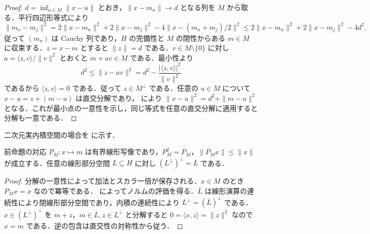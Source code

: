 \begin{proof}
$d=\inf_{u\in M}\|x-u\|$ とおき，$\|x-m_n\|\to d$ となる列を $M$ から取る．平行四辺形等式により
\[
\|m_n-m_j\|^2=2\|x-m_n\|^2+2\|x-m_j\|^2-4\|x-(m_n+m_j)/2\|^2
\leq 2\|x-m_n\|^2+2\|x-m_j\|^2-4d^2 .
\]
従って $(m_n)$ は Cauchy 列であり，$H$ の完備性と $M$ の閉性からある $m\in M$ に収束する．$z=x-m$ とすると $\|z\|=d$ である．$v\in M\setminus\{0\}$ に対し $a=\langle z,v\rangle/\|v\|^2$ とおくと $m+av\in M$ である．最小性より
\[
d^2\leq\|z-av\|^2=d^2-\frac{|\langle z,v\rangle|^2}{\|v\|^2}
\]
であるから $\langle z,v\rangle=0$ である．従って $z\in M^\perp$ である．任意の $u\in M$ について $x-u=z+(m-u)$ は直交分解であり， により $\|x-u\|^2=d^2+\|m-u\|^2$ となる．これが最小点の一意性を示し，同じ等式を任意の直交分解に適用すると分解も一意である．
\end{proof}
二次元実内積空間の場合を  に示す．
\begin{prop}[直交射影の線形性と二重直交補]
前命題の対応 $P_M:x\mapsto m$ は有界線形写像であり，$P_M^2=P_M$，$\|P_M x\|\leq\|x\|$ が成立する．任意の線形部分空間 $L\subseteq H$ に対し $(L^\perp)^\perp=\overline L$ である．
\end{prop}
\begin{proof}
分解の一意性によって加法とスカラー倍が保存される．$x\in M$ のとき $P_Mx=x$ なので冪等である． によってノルムの評価を得る．$\overline L$ は線形演算の連続性により閉線形部分空間であり，内積の連続性により $L^\perp=(\overline L)^\perp$ である．$x\in (L^\perp)^\perp$ を $m+z$，$m\in\overline L,z\in L^\perp$ と分解すると $0=\langle x,z\rangle=\|z\|^2$ なので $x=m$ である．逆の包含は直交性の対称性から従う．
\end{proof}
